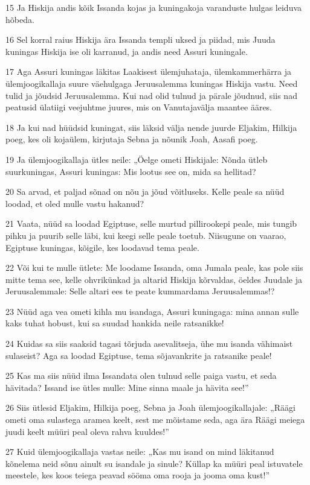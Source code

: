 \par 15 Ja Hiskija andis kõik Issanda kojas ja kuningakoja varanduste hulgas leiduva hõbeda.
\par 16 Sel korral raius Hiskija ära Issanda templi uksed ja piidad, mis Juuda kuningas Hiskija ise oli karranud, ja andis need Assuri kuningale.
\par 17 Aga Assuri kuningas läkitas Laakisest ülemjuhataja, ülemkammerhärra ja ülemjoogikallaja suure väehulgaga Jeruusalemma kuningas Hiskija vastu. Need tulid ja jõudsid Jeruusalemma. Kui nad olid tulnud ja pärale jõudnud, siis nad peatusid ülatiigi veejuhtme juures, mis on Vanutajavälja maantee ääres.
\par 18 Ja kui nad hüüdsid kuningat, siis läksid välja nende juurde Eljakim, Hilkija poeg, kes oli kojaülem, kirjutaja Sebna ja nõunik Joah, Aasafi poeg.
\par 19 Ja ülemjoogikallaja ütles neile: „Öelge ometi Hiskijale: Nõnda ütleb suurkuningas, Assuri kuningas: Mis lootus see on, mida sa hellitad?
\par 20 Sa arvad, et paljad sõnad on nõu ja jõud võitluseks. Kelle peale sa nüüd loodad, et oled mulle vastu hakanud?
\par 21 Vaata, nüüd sa loodad Egiptuse, selle murtud pillirookepi peale, mis tungib pihku ja puurib selle läbi, kui keegi selle peale toetub. Niisugune on vaarao, Egiptuse kuningas, kõigile, kes loodavad tema peale.
\par 22 Või kui te mulle ütlete: Me loodame Issanda, oma Jumala peale, kas pole siis mitte tema see, kelle ohvrikünkad ja altarid Hiskija kõrvaldas, öeldes Juudale ja Jeruusalemmale: Selle altari ees te peate kummardama Jeruusalemmas!?
\par 23 Nüüd aga vea ometi kihla mu isandaga, Assuri kuningaga: mina annan sulle kaks tuhat hobust, kui sa suudad hankida neile ratsanikke!
\par 24 Kuidas sa siis saaksid tagasi tõrjuda asevalitseja, ühe mu isanda vähimaist sulaseist? Aga sa loodad Egiptuse, tema sõjavankrite ja ratsanike peale!
\par 25 Kas ma siis nüüd ilma Issandata olen tulnud selle paiga vastu, et seda hävitada? Issand ise ütles mulle: Mine sinna maale ja hävita see!”
\par 26 Siis ütlesid Eljakim, Hilkija poeg, Sebna ja Joah ülemjoogikallajale: „Räägi ometi oma sulastega aramea keelt, sest me mõistame seda, aga ära Räägi meiega juudi keelt müüri peal oleva rahva kuuldes!”
\par 27 Kuid ülemjoogikallaja vastas neile: „Kas mu isand on mind läkitanud kõnelema neid sõnu ainult su isandale ja sinule? Küllap ka müüri peal istuvatele meestele, kes koos teiega peavad sööma oma rooja ja jooma oma kust!”
